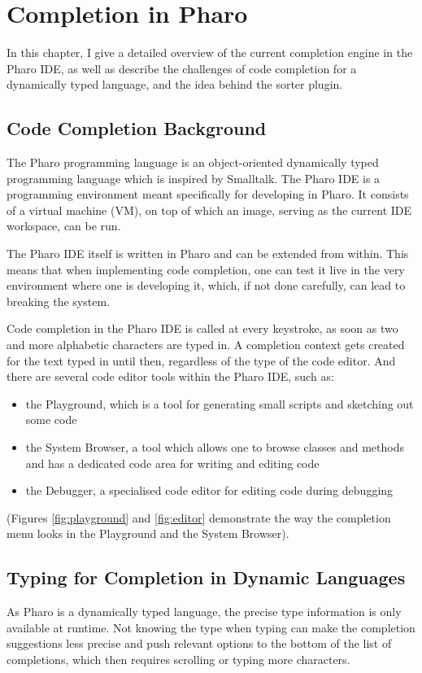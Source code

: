 \chapter{Completion in Pharo}
\label{chap:PharoCompletion}

In this chapter, I give a detailed overview of the current completion engine in the Pharo IDE, as well as describe the challenges of code completion for a dynamically typed language, and the idea behind the sorter plugin.

\section{Code Completion Background}
\label{sec:PharoCompletion-Background}
The Pharo programming language is an object-oriented dynamically typed programming language which is inspired by Smalltalk. The Pharo IDE is a programming environment meant specifically for developing in Pharo. It consists of a virtual machine (VM), on top of which an image, serving as the current IDE workspace, can be run.

The Pharo IDE itself is written in Pharo and can be extended from within. This means that when implementing code completion, one can test it live in the very environment where one is developing it, which, if not done carefully, can lead to breaking the system.

Code completion in the Pharo IDE is called at every keystroke, as soon as two and more alphabetic characters are typed in. A completion context gets created for the text typed in until then, regardless of the type of the code editor. And there are several code editor tools within the Pharo IDE, such as:
\begin{itemize}
    \item the Playground, which is a tool for generating small scripts and sketching out some code
    \item the System Browser, a tool which allows one to browse classes and methods and has a dedicated code area for writing and editing code
    \item the Debugger, a specialised code editor for editing code during debugging
\end{itemize}
(Figures \ref{fig:playground} and \ref{fig:editor} demonstrate the way the completion menu looks in the Playground and the System Browser).

\section{Typing for Completion in Dynamic Languages}
\label{sec:PharoCompletion-Typing}
As Pharo is a dynamically typed language, the precise type information is only available at runtime. Not knowing the type when typing can make the completion suggestions less precise and push relevant options to the bottom of the list of completions, which then requires scrolling or typing more characters.


